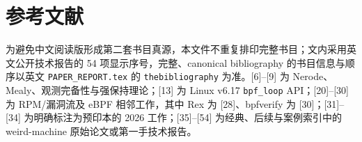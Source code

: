 \documentclass[
  11pt,
  a4paper,
]{ctexart}
\begin{document}
\hypertarget{ux53c2ux8003ux6587ux732e}{%
\section{参考文献}\label{ux53c2ux8003ux6587ux732e}}

为避免中文阅读版形成第二套书目真源，本文件不重复排印完整书目；文内采用英文公开技术报告的
54 项显示序号，完整、canonical bibliography 的书目信息与顺序以英文
\texttt{PAPER\_REPORT.tex} 的 \texttt{thebibliography}
为准。{[}6{]}--{[}9{]} 为
Nerode、Mealy、观测完备性与强保持理论；{[}13{]} 为 Linux v6.17
\texttt{bpf\_loop} API；{[}20{]}--{[}30{]} 为 RPM/漏洞流及 eBPF
相邻工作，其中 Rex 为 {[}28{]}、bpfverify 为
{[}30{]}；{[}31{]}--{[}34{]} 为明确标注为预印本的 2026
工作；{[}35{]}--{[}54{]}
为经典、后续与案例索引中的 weird-machine 原始论文或第一手技术报告。
\end{document}
